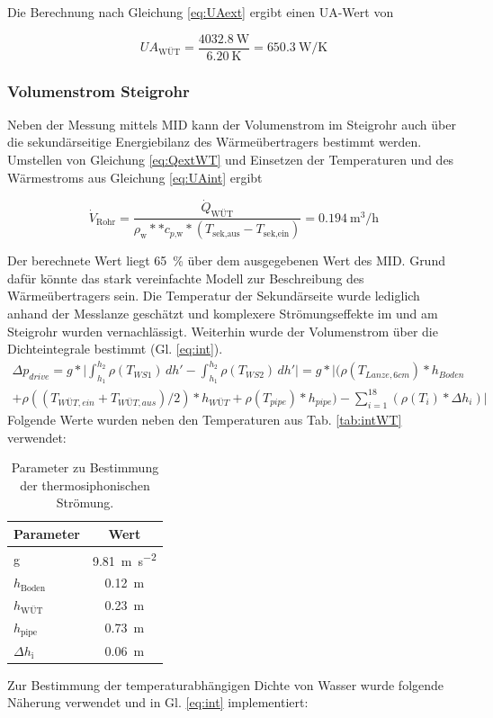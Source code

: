 Die Berechnung nach Gleichung \ref{eq:UAext} ergibt einen UA-Wert von

\begin{equation}
	\label{eq:UAint}
		UA_{\text{WÜT}} = \frac{\SI{4032,8}{\watt}}{\SI{6,20}{\kelvin}} = \SI{650,3}{\watt\per\kelvin}
\end{equation}

\subsubsection{Volumenstrom Steigrohr}
Neben der Messung mittels MID kann der Volumenstrom im Steigrohr auch über die sekundärseitige Energiebilanz des Wärmeübertragers bestimmt werden. Umstellen von Gleichung \ref{eq:QextWT} und Einsetzen der Temperaturen und des Wärmestroms aus Gleichung \ref{eq:UAint} ergibt

\begin{equation}
	\label{eq:Vdot}
	\dot{V}_{\text{Rohr}}  =\frac{\dot{Q}_{\text{WÜT}}}{\rho_{\text{w}} *  * c_{p\text{,w}} * (T_{\text{sek,aus}}-T_{\text{sek,ein}})}  = \SI{0,194}{\cubic\meter\per\hour}
\end{equation}

Der berechnete Wert liegt \SI{65}{\percent} über dem ausgegebenen Wert des MID. Grund dafür könnte das stark vereinfachte Modell zur Beschreibung des Wärmeübertragers sein. Die Temperatur der Sekundärseite wurde lediglich anhand der Messlanze geschätzt und komplexere Strömungseffekte im und am Steigrohr wurden vernachlässigt. Weiterhin wurde der Volumenstrom über die Dichteintegrale bestimmt (Gl. \ref{eq:int}).
\begin{multline}
	\label{eq:int}
	\Delta p_{drive}=g*\biggl|\int_{h_{1}}^{h_{2}}\rho(T_{WS1})\,dh'-\int_{h_{1}}^{h_{2}}\rho(T_{WS2})\,dh'\biggl|=g*\biggl|(\rho(T_{Lanze,6cm})*h_{Boden}\\+\rho((T_{WÜT,ein}+T_{WÜT,aus})/2)*h_{WÜT}+\rho(T_{pipe})*h_{pipe})-\sum\limits_{i=1}^{18}(\rho(T_{i})*\Delta h_{i})\biggl|
\end{multline}
Folgende Werte wurden neben den Temperaturen aus Tab. \ref{tab:intWT} verwendet:

\begin{table}[H]
	\centering
	\caption{Parameter zu Bestimmung der thermosiphonischen Strömung.}
	\begin{tabular}{lc}
		\toprule
		\textbf{Parameter} & \textbf{Wert}\\
		\midrule
		g & \SI{9,81}{\meter\per\square\second}\\
		$h_{\text{Boden}}$ & \SI{0,12}{\meter}   \\
		$h_{\text{WÜT}}$ & \SI{0,23}{\meter}   \\
		$h_{\text{pipe}}$ & \SI{0,73}{\meter}   \\
		$\Delta h_{\text{i}}$ & \SI{0,06}{\meter}   \\
		\bottomrule
	\end{tabular}

\label{tab:par}
\end{table}
Zur Bestimmung der temperaturabhängigen Dichte von Wasser wurde folgende Näherung verwendet und in Gl. \ref{eq:int} implementiert:

